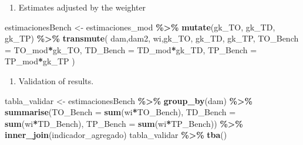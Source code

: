 \documentclass[
  12pt,
]{book}
\newenvironment{Shaded}{\begin{snugshade}}{\end{snugshade}}
\newcommand{\AttributeTok}[1]{\textcolor[rgb]{0.13,0.29,0.53}{#1}}
\newcommand{\FunctionTok}[1]{\textcolor[rgb]{0.13,0.29,0.53}{\textbf{#1}}}
\newcommand{\NormalTok}[1]{#1}
\newcommand{\OtherTok}[1]{\textcolor[rgb]{0.56,0.35,0.01}{#1}}
\newcommand{\SpecialCharTok}[1]{\textcolor[rgb]{0.81,0.36,0.00}{\textbf{#1}}}
\providecommand{\tightlist}{%
  \setlength{\itemsep}{0pt}\setlength{\parskip}{0pt}}
\begin{document}
\begin{enumerate}
\def\labelenumi{\arabic{enumi}.}
\setcounter{enumi}{6}
\tightlist
\item
  Estimates adjusted by the weighter
\end{enumerate}

\begin{Shaded}
\begin{Highlighting}[]
\NormalTok{estimacionesBench }\OtherTok{\textless{}{-}}\NormalTok{ estimaciones\_mod }\SpecialCharTok{\%\textgreater{}\%}
  \FunctionTok{mutate}\NormalTok{(gk\_TO, gk\_TD, gk\_TP) }\SpecialCharTok{\%\textgreater{}\%}
  \FunctionTok{transmute}\NormalTok{(}
\NormalTok{    dam,dam2,}
\NormalTok{    wi,gk\_TO, gk\_TD, gk\_TP,}
    \AttributeTok{TO\_Bench =}\NormalTok{ TO\_mod}\SpecialCharTok{*}\NormalTok{gk\_TO,}
    \AttributeTok{TD\_Bench =}\NormalTok{ TD\_mod}\SpecialCharTok{*}\NormalTok{gk\_TD,}
    \AttributeTok{TP\_Bench =}\NormalTok{ TP\_mod}\SpecialCharTok{*}\NormalTok{gk\_TP}
\NormalTok{  ) }
\end{Highlighting}
\end{Shaded}

\begin{enumerate}
\def\labelenumi{\arabic{enumi}.}
\setcounter{enumi}{7}
\tightlist
\item
  Validation of results.
\end{enumerate}

\begin{Shaded}
\begin{Highlighting}[]
\NormalTok{tabla\_validar }\OtherTok{\textless{}{-}}\NormalTok{ estimacionesBench }\SpecialCharTok{\%\textgreater{}\%}
  \FunctionTok{group\_by}\NormalTok{(dam) }\SpecialCharTok{\%\textgreater{}\%} 
  \FunctionTok{summarise}\NormalTok{(}\AttributeTok{TO\_Bench =} \FunctionTok{sum}\NormalTok{(wi}\SpecialCharTok{*}\NormalTok{TO\_Bench),}
            \AttributeTok{TD\_Bench =} \FunctionTok{sum}\NormalTok{(wi}\SpecialCharTok{*}\NormalTok{TD\_Bench),}
            \AttributeTok{TP\_Bench =} \FunctionTok{sum}\NormalTok{(wi}\SpecialCharTok{*}\NormalTok{TP\_Bench)) }\SpecialCharTok{\%\textgreater{}\%} 
  \FunctionTok{inner\_join}\NormalTok{(indicador\_agregado)}
\NormalTok{tabla\_validar }\SpecialCharTok{\%\textgreater{}\%} \FunctionTok{tba}\NormalTok{()}
\end{Highlighting}
\end{Shaded}
\end{document}
